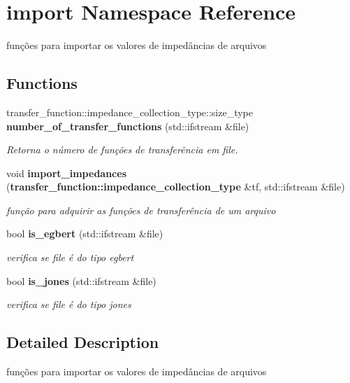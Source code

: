 \section{import Namespace Reference}
\label{namespaceimport}
funções para importar os valores de impedâncias de arquivos  


\subsection*{Functions}
\begin{CompactItemize}
\item 
transfer\_\-function::impedance\_\-collection\_\-type::size\_\-type {\bf number\_\-of\_\-transfer\_\-functions} (std::ifstream \&file)
\begin{CompactList}\small\item\em Retorna o número de funções de transferência em {\em file\/}. \item\end{CompactList}\item 
void {\bf import\_\-impedances} ({\bf transfer\_\-function::impedance\_\-collection\_\-type} \&tf, std::ifstream \&file)
\begin{CompactList}\small\item\em função para adquirir as funções de transferência de um arquivo \item\end{CompactList}\item 
bool {\bf is\_\-egbert} (std::ifstream \&file)
\begin{CompactList}\small\item\em verifica se {\em file\/} é do tipo egbert \item\end{CompactList}\item 
bool {\bf is\_\-jones} (std::ifstream \&file)
\begin{CompactList}\small\item\em verifica se {\em file\/} é do tipo jones \item\end{CompactList}\end{CompactItemize}


\subsection{Detailed Description}
funções para importar os valores de impedâncias de arquivos 

